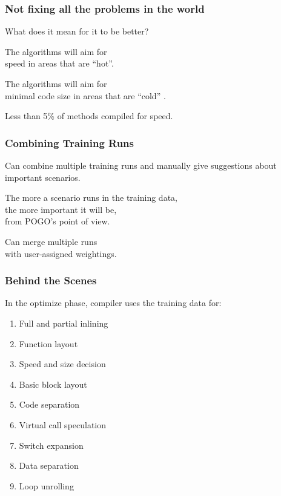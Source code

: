 \begin{frame}
\frametitle{Not fixing all the problems in the world}

\large
\begin{changemargin}{2cm}
What does it mean for it to be better? 

The algorithms will aim for \\
speed in areas that are ``hot''. 

The algorithms will aim for \\
minimal code size in areas that are ``cold'' .

Less than 5\% of methods compiled for speed.
\end{changemargin}
\end{frame}



\begin{frame}
\frametitle{Combining Training Runs}

\large
\begin{changemargin}{2cm}
Can combine multiple training runs and manually give suggestions about important scenarios.

The more a scenario runs in the training data, \\
the more important it will be, \\
from POGO's point of view.

Can merge multiple runs \\
with user-assigned weightings.
\end{changemargin}

\end{frame}


\begin{frame}
\frametitle{Behind the Scenes}

\large
\begin{changemargin}{2cm}
In the optimize phase, compiler uses the training data for:

\begin{enumerate}
\item Full and partial inlining
\item Function layout
\item Speed and size decision
\item Basic block layout 
\item Code separation
\item Virtual call speculation
\item Switch expansion
\item Data separation
\item Loop unrolling
\end{enumerate}
\end{changemargin}
\end{frame}



